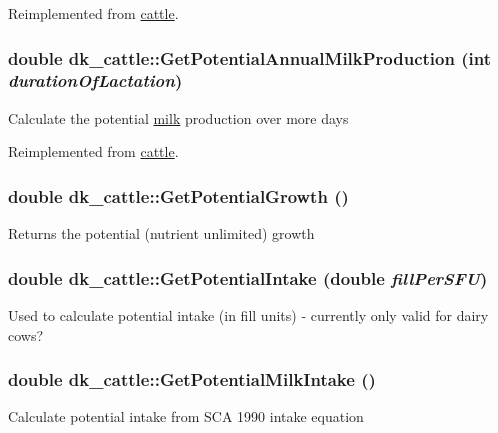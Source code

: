 Reimplemented from \hyperlink{classcattle_aeac6984f3aed6a1b0c37b609ffdbc02a}{cattle}.\hypertarget{classdk__cattle_a21fa59d45d64b1aa106d3e4e2912550a}{
\subsubsection[{GetPotentialAnnualMilkProduction}]{\setlength{\rightskip}{0pt plus 5cm}double dk\_\-cattle::GetPotentialAnnualMilkProduction (int {\em durationOfLactation})}}
\label{classdk__cattle_a21fa59d45d64b1aa106d3e4e2912550a}
Calculate the potential \hyperlink{classmilk}{milk} production over more days 

Reimplemented from \hyperlink{classcattle_a4de5ef9578b7f00f7fd0135001d2bf0f}{cattle}.\hypertarget{classdk__cattle_a13eb51ee37ba5528aae60b90f28f2e5e}{
\subsubsection[{GetPotentialGrowth}]{\setlength{\rightskip}{0pt plus 5cm}double dk\_\-cattle::GetPotentialGrowth ()}}
\label{classdk__cattle_a13eb51ee37ba5528aae60b90f28f2e5e}
Returns the potential (nutrient unlimited) growth \hypertarget{classdk__cattle_afa9e669b0e28bed057553b3ac5a8694b}{
\subsubsection[{GetPotentialIntake}]{\setlength{\rightskip}{0pt plus 5cm}double dk\_\-cattle::GetPotentialIntake (double {\em fillPerSFU})}}
\label{classdk__cattle_afa9e669b0e28bed057553b3ac5a8694b}
Used to calculate potential intake (in fill units) -\/ currently only valid for dairy cows? \hypertarget{classdk__cattle_ac3beb86fb1736f85fc2330f31bb5bfee}{
\subsubsection[{GetPotentialMilkIntake}]{\setlength{\rightskip}{0pt plus 5cm}double dk\_\-cattle::GetPotentialMilkIntake ()}}
\label{classdk__cattle_ac3beb86fb1736f85fc2330f31bb5bfee}
Calculate potential intake from SCA 1990 intake equation 

